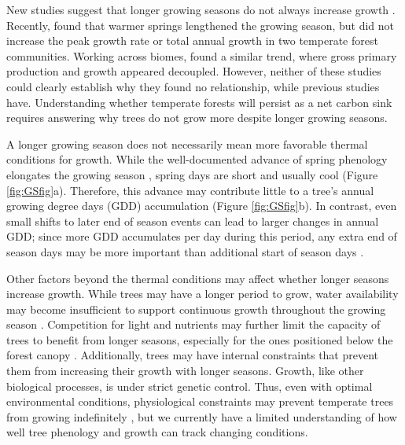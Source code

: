 New studies suggest that longer growing seasons do not always increase growth \citep{dow_warm_2022,silvestro_longer_2023,matula_shifts_2023,charletdesauvage_temperature_2022,cabon_crossbiome_2022}. Recently, \cite{dow_warm_2022} found that warmer springs lengthened the growing season, but did not increase the peak growth rate or total annual growth in two temperate forest communities. Working across biomes, \cite{cabon_crossbiome_2022} found a similar trend, where gross primary production and growth appeared decoupled. However, neither of these studies could clearly establish why they found no relationship, while previous studies have. Understanding whether temperate forests will persist as a net carbon sink requires answering why trees do not grow more despite longer growing seasons. 

A longer growing season does not necessarily mean more favorable thermal conditions for growth. While the well-documented advance of spring phenology elongates the growing season \citep{keenan_net_2014}, spring days are short and usually cool (Figure \ref{fig:GSfig}a). Therefore, this advance may contribute little to a tree's annual growing degree days (GDD) accumulation (Figure \ref{fig:GSfig}b). In contrast, even small shifts to later end of season events can lead to larger changes in annual GDD; since more GDD accumulates per day during this period, any extra end of season days may be more important than additional start of season days \citep{buonaiuto_early_2026}.  

Other factors beyond the thermal conditions may affect whether longer seasons increase growth. While trees may have a longer period to grow, water availability may become insufficient to support continuous growth throughout the growing season \citep{wang_seasonal_2025}. Competition for light and nutrients may further limit the capacity of trees to benefit from longer seasons, especially for the ones positioned below the forest canopy \citep{cleland_effects_2024,augspurger_differences_2003,sweeneyComparisonTimingSpring2024}. Additionally, trees may have internal constraints that prevent them from increasing their growth with longer seasons. Growth, like other biological processes, is under strict genetic control. Thus, even with optimal environmental conditions, physiological constraints may prevent temperate trees from growing indefinitely \citep{korner_four_2023,wolkovich_why_2025}, but we currently have a limited understanding of how well tree phenology and growth can track changing conditions. 

